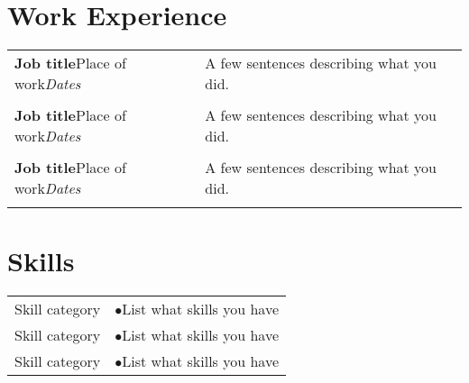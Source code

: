 \documentclass[11pt,a4paper]{moderncv}
\begin{document}
\section{Work Experience}
\begin{tabular}{p{}p{}}
\textbf{Job title}\newline Place of work\newline \textit{Dates}&A few sentences describing what you did.\\
\\
\textbf{Job title}\newline Place of work\newline \textit{Dates}&A few sentences describing what you did.\\
\\
\textbf{Job title}\newline Place of work\newline \textit{Dates}&A few sentences describing what you did.\\
\\
\end{tabular}

\section{Skills}
\begin{tabular}{p{}p{}}
Skill category &$\bullet$List what skills you have\\

Skill category &$\bullet$List what skills you have\\

Skill category &$\bullet$List what skills you have\\
\end{tabular}
\end{document}
